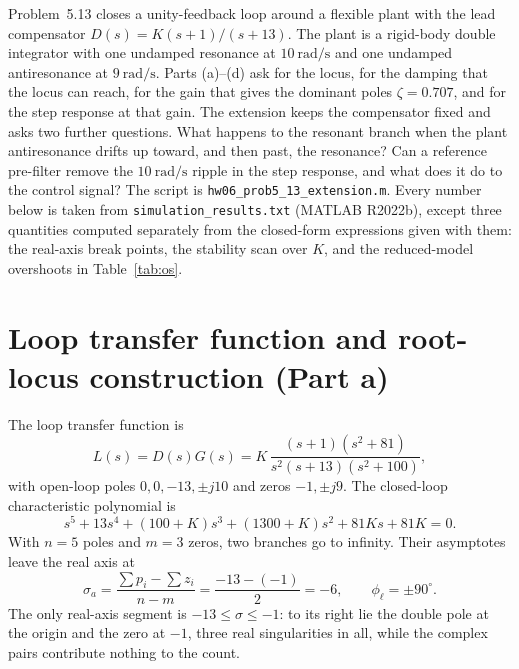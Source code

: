 \documentclass[12pt,a4paper]{article}
\begin{document}
Problem~5.13 closes a unity-feedback loop around a flexible plant with the lead compensator
\(D(s)=K(s+1)/(s+13)\).
The plant is a rigid-body double integrator with one undamped resonance at \(10~\mathrm{rad/s}\) and one undamped antiresonance at \(9~\mathrm{rad/s}\).
Parts (a)--(d) ask for the locus, for the damping that the locus can reach, for the gain that gives the dominant poles \(\zeta=0.707\), and for the step response at that gain.
The extension keeps the compensator fixed and asks two further questions.
What happens to the resonant branch when the plant antiresonance drifts up toward, and then past, the resonance?
Can a reference pre-filter remove the \(10~\mathrm{rad/s}\) ripple in the step response, and what does it do to the control signal?
The script is \texttt{hw06\_prob5\_13\_extension.m}. Every number below is taken from \texttt{simulation\_results.txt} (MATLAB R2022b), except three quantities computed separately from the closed-form expressions given with them: the real-axis break points, the stability scan over \(K\), and the reduced-model overshoots in Table~\ref{tab:os}.

\section{Loop transfer function and root-locus construction (Part a)}

The loop transfer function is
\begin{equation}
  L(s)=D(s)G(s)=K\,\frac{(s+1)(s^2+81)}{s^2(s+13)(s^2+100)},
  \label{eq:L}
\end{equation}
with open-loop poles \(0,0,-13,\pm j10\) and zeros \(-1,\pm j9\).
The closed-loop characteristic polynomial is
\begin{equation}
  s^5+13s^4+(100+K)s^3+(1300+K)s^2+81Ks+81K=0 .
  \label{eq:char}
\end{equation}
With \(n=5\) poles and \(m=3\) zeros, two branches go to infinity.
Their asymptotes leave the real axis at
\begin{equation}
  \sigma_a=\frac{\sum p_i-\sum z_i}{n-m}=\frac{-13-(-1)}{2}=-6,
  \qquad
  \phi_\ell=\pm 90^\circ .
  \label{eq:asym}
\end{equation}
The only real-axis segment is \(-13\le\sigma\le-1\): to its right lie the double pole at the origin and the zero at \(-1\), three real singularities in all, while the complex pairs contribute nothing to the count.
\end{document}

